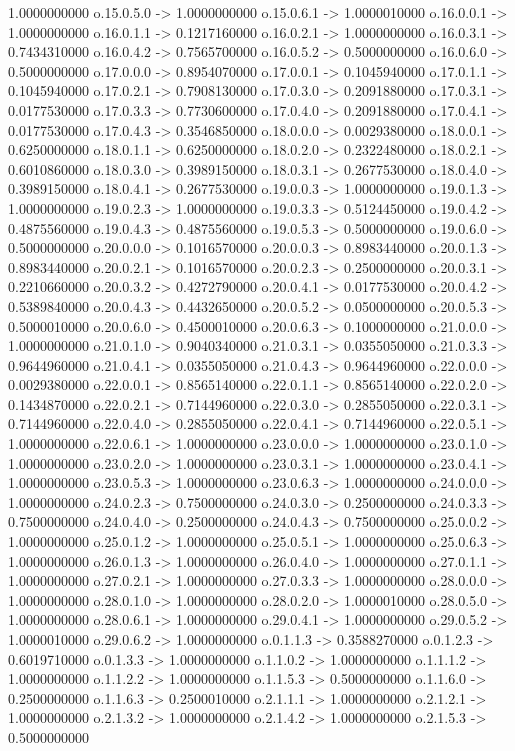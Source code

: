 1.0000000000    o.15.0.5.0 -> 1.0000000000    o.15.0.6.1 -> 1.0000010000    o.16.0.0.1 -> 1.0000000000    o.16.0.1.1 -> 0.1217160000    o.16.0.2.1 -> 1.0000000000    o.16.0.3.1 -> 0.7434310000    o.16.0.4.2 -> 0.7565700000    o.16.0.5.2 -> 0.5000000000    o.16.0.6.0 -> 0.5000000000    o.17.0.0.0 -> 0.8954070000    o.17.0.0.1 -> 0.1045940000    o.17.0.1.1 -> 0.1045940000    o.17.0.2.1 -> 0.7908130000    o.17.0.3.0 -> 0.2091880000    o.17.0.3.1 -> 0.0177530000    o.17.0.3.3 -> 0.7730600000    o.17.0.4.0 -> 0.2091880000    o.17.0.4.1 -> 0.0177530000    o.17.0.4.3 -> 0.3546850000    o.18.0.0.0 -> 0.0029380000    o.18.0.0.1 -> 0.6250000000    o.18.0.1.1 -> 0.6250000000    o.18.0.2.0 -> 0.2322480000    o.18.0.2.1 -> 0.6010860000    o.18.0.3.0 -> 0.3989150000    o.18.0.3.1 -> 0.2677530000    o.18.0.4.0 -> 0.3989150000    o.18.0.4.1 -> 0.2677530000    o.19.0.0.3 -> 1.0000000000    o.19.0.1.3 -> 1.0000000000    o.19.0.2.3 -> 1.0000000000    o.19.0.3.3 -> 0.5124450000    o.19.0.4.2 -> 0.4875560000    o.19.0.4.3 -> 0.4875560000    o.19.0.5.3 -> 0.5000000000    o.19.0.6.0 -> 0.5000000000    o.20.0.0.0 -> 0.1016570000    o.20.0.0.3 -> 0.8983440000    o.20.0.1.3 -> 0.8983440000    o.20.0.2.1 -> 0.1016570000    o.20.0.2.3 -> 0.2500000000    o.20.0.3.1 -> 0.2210660000    o.20.0.3.2 -> 0.4272790000    o.20.0.4.1 -> 0.0177530000    o.20.0.4.2 -> 0.5389840000    o.20.0.4.3 -> 0.4432650000    o.20.0.5.2 -> 0.0500000000    o.20.0.5.3 -> 0.5000010000    o.20.0.6.0 -> 0.4500010000    o.20.0.6.3 -> 0.1000000000    o.21.0.0.0 -> 1.0000000000    o.21.0.1.0 -> 0.9040340000    o.21.0.3.1 -> 0.0355050000    o.21.0.3.3 -> 0.9644960000    o.21.0.4.1 -> 0.0355050000    o.21.0.4.3 -> 0.9644960000    o.22.0.0.0 -> 0.0029380000    o.22.0.0.1 -> 0.8565140000    o.22.0.1.1 -> 0.8565140000    o.22.0.2.0 -> 0.1434870000    o.22.0.2.1 -> 0.7144960000    o.22.0.3.0 -> 0.2855050000    o.22.0.3.1 -> 0.7144960000    o.22.0.4.0 -> 0.2855050000    o.22.0.4.1 -> 0.7144960000    o.22.0.5.1 -> 1.0000000000    o.22.0.6.1 -> 1.0000000000    o.23.0.0.0 -> 1.0000000000    o.23.0.1.0 -> 1.0000000000    o.23.0.2.0 -> 1.0000000000    o.23.0.3.1 -> 1.0000000000    o.23.0.4.1 -> 1.0000000000    o.23.0.5.3 -> 1.0000000000    o.23.0.6.3 -> 1.0000000000    o.24.0.0.0 -> 1.0000000000    o.24.0.2.3 -> 0.7500000000    o.24.0.3.0 -> 0.2500000000    o.24.0.3.3 -> 0.7500000000    o.24.0.4.0 -> 0.2500000000    o.24.0.4.3 -> 0.7500000000    o.25.0.0.2 -> 1.0000000000    o.25.0.1.2 -> 1.0000000000    o.25.0.5.1 -> 1.0000000000    o.25.0.6.3 -> 1.0000000000    o.26.0.1.3 -> 1.0000000000    o.26.0.4.0 -> 1.0000000000    o.27.0.1.1 -> 1.0000000000    o.27.0.2.1 -> 1.0000000000    o.27.0.3.3 -> 1.0000000000    o.28.0.0.0 -> 1.0000000000    o.28.0.1.0 -> 1.0000000000    o.28.0.2.0 -> 1.0000010000    o.28.0.5.0 -> 1.0000000000    o.28.0.6.1 -> 1.0000000000    o.29.0.4.1 -> 1.0000000000    o.29.0.5.2 -> 1.0000010000    o.29.0.6.2 -> 1.0000000000    o.0.1.1.3 -> 0.3588270000    o.0.1.2.3 -> 0.6019710000    o.0.1.3.3 -> 1.0000000000    o.1.1.0.2 -> 1.0000000000    o.1.1.1.2 -> 1.0000000000    o.1.1.2.2 -> 1.0000000000    o.1.1.5.3 -> 0.5000000000    o.1.1.6.0 -> 0.2500000000    o.1.1.6.3 -> 0.2500010000    o.2.1.1.1 -> 1.0000000000    o.2.1.2.1 -> 1.0000000000    o.2.1.3.2 -> 1.0000000000    o.2.1.4.2 -> 1.0000000000    o.2.1.5.3 -> 0.5000000000    